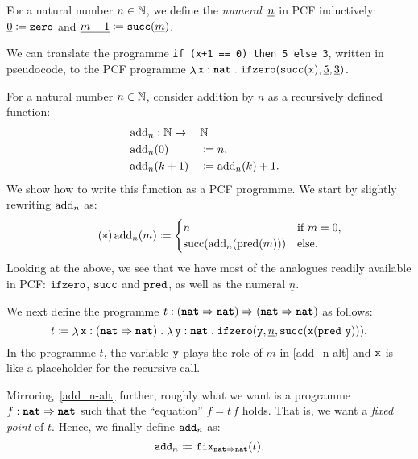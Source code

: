 \begin{definition}
  For a natural number \(n \in \Nat\), we define the
  \emph{numeral}~\(\numeral n\) in PCF inductively:
  \(\numeral 0 \coloneqq \pcfzero\) and
  \(\numeral{m+1} \coloneqq \pcfsuc(\numeral m)\).
\end{definition}

\begin{example}
  We can translate the programme \verb|if (x+1 == 0) then 5 else 3|, written in
  pseudocode, to the PCF programme
  \(\lambdadot{\var x : \pcfnat}{\pcfifz(\pcfsuc(\var x),\numeral 5,\numeral 3)}\).
\end{example}

\begin{example}
  For a natural number \(n \in \Nat\), consider addition by \(n\) as a
  recursively defined function:
  \begin{alignat*}{3}
    &\add_n : \Nat \to && \Nat && \\
    &\add_n(0) &&\coloneqq n, && \\
    &\add_n(k+1) &&\coloneqq \add_n(k) + 1. &&
  \end{alignat*}
  We show how to write this function as a PCF programme. We start by slightly
  rewriting \(\add_n\) as:
  \begin{equation*}\label{add_n-alt}\tag{\(\ast\)}
    \add_n(m) \coloneqq
    \begin{cases}
      n &\text{if } m = 0, \\
      \suc\pa*{\add_n(\pred(m))} &\text{else}.
    \end{cases}
  \end{equation*}
  Looking at the above, we see that we have most of the analogues readily
  available in PCF: \(\pcfifz\), \(\pcfsuc\) and \(\pcfpred\), as well as the
  numeral \(\underline n\).

  We next define the programme
  \(t : \pa*{\pcfnat \pcffun \pcfnat} \pcffun \pa*{\pcfnat \pcffun \pcfnat}\) as
  follows:
  \[
    t \coloneqq \lambdadot{\var x : \pa{\pcfnat \pcffun
        \pcfnat}}{\lambdadot{\var y : \pcfnat}%
      {\pcfifz\pa*{\var y,\numeral{n},%
          \pcfsuc\pa*{\var x\pa*{\pcfpred \, \var y }}}}}.
  \]
  In the programme \(t\), the variable \(\var y\) plays the role of \(m\) in
  \eqref{add_n-alt} and \(\var x\) is like a placeholder for the recursive call.

  Mirroring~\eqref{add_n-alt} further, roughly what we want is a programme
  \(f : \pcfnat \pcffun \pcfnat\) such that the ``equation''
  \(f = t\,f\) holds. That is, we want a \emph{fixed point} of \(t\).
  Hence, we finally define \(\pcfadd_n\) as:
  \[
    \pcfadd_n \coloneqq \fix_{\pcfnat \pcffun \pcfnat}(t).
  \]
\end{example}

